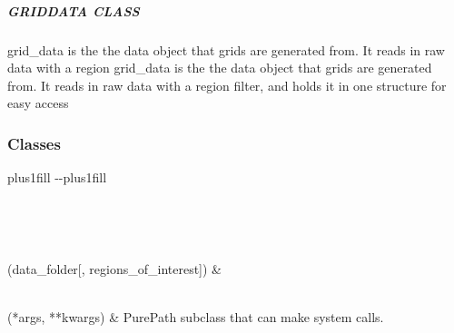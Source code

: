 \documentclass[letterpaper,10pt,english]{sphinxmanual}
\begin{document}
\subparagraph{GRIDDATA CLASS}
\label{\detokenize{src.models.hydrogen.network.grid_data:griddata-class}}
\sphinxAtStartPar
grid\_data is the the data object that grids are generated from. It reads in raw data with a region
grid\_data is the the data object that grids are generated from. It reads in raw data with a region
filter, and holds it in one structure for easy access
\subsubsection*{Classes}


\begin{savenotes}
\sphinxatlongtablestart
\sphinxthistablewithglobalstyle
\sphinxthistablewithnovlinesstyle
\makeatletter
  \LTleft \@totalleftmargin plus1fill
  \LTright\dimexpr\columnwidth-\@totalleftmargin-\linewidth\relax plus1fill
\makeatother
\begin{longtable}{}
\sphinxtoprule
\endfirsthead

\\
\sphinxtoprule
\endhead

\sphinxbottomrule
{}\\
\endfoot

\endlastfoot
\sphinxtableatstartofbodyhook

\sphinxAtStartPar
{\hyperref[\detokenize{src.models.hydrogen.network.grid_data:src.models.hydrogen.network.grid_data.GridData}]{}}(data\_folder{[}, regions\_of\_interest{]})
&
\sphinxAtStartPar

\\
\sphinxhline
\sphinxAtStartPar
{}(*args, **kwargs)
&
\sphinxAtStartPar
PurePath subclass that can make system calls.
\\
\sphinxbottomrule
\end{longtable}
\sphinxtableafterendhook
\sphinxatlongtableend
\end{savenotes}

\begin{fulllineitems}
\label{\detokenize{src.models.hydrogen.network.grid_data:src.models.hydrogen.network.grid_data.GridData}}
\pysigstartsignatures
\pysiglinewithargsret
{}
{\sphinxparamcomma {}}
{}
\pysigstopsignatures
\end{fulllineitems}
\end{document}
